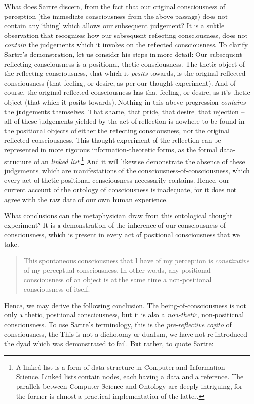 \noindent
What does Sartre discern, from the fact that our original consciousness of perception (the immediate consciousness from the above passage) does not contain any \enquote*{thing} which allows our subsequent judgement? It is a subtle observation that recognises how our subsequent reflecting consciousness, does not \emph{contain} the judgements which it invokes on the reflected consciousness.
To clarify Sartre's demonstration, let us consider his steps in more detail:
Our subsequent reflecting consciousness is a positional, thetic consciousness. The thetic object of the reflecting consciousness, that which it \emph{posits} towards, is the original reflected consciousness (that feeling, or desire, as per our thought experiment). And of course, the original reflected consciousness has that feeling, or desire, as it's thetic object (that which it posits towards). Nothing in this above progression \emph{contains} the judgements themselves. That shame, that pride, that desire, that rejection -- all of these judgements yielded by the act of reflection is nowhere to be found in the positional objects of either the reflecting consciousness, nor the original reflected consciousness. This thought experiment of the reflection can be represented in more rigorous information-theoretic forms, as the formal data-structure of an \emph{linked list}.\footnote{A linked list is a form of data-structure in Computer and Information Science. Linked lists contain nodes, each having a data and a reference. The parallels between Computer Science and Ontology are deeply intriguing, for the former is almost a practical implementation of the latter.} And it will likewise demonstrate the absence of these judgements, which are manifestations of the consciousness-of-consciousness, which every act of thetic positional consciousness necessarily contains. Hence, our current account of the ontology of consciousness is inadequate, for it does not agree with the raw data of our own human experience.

What conclusions can the metaphysician draw from this ontological thought experiment? It is a demonstration of the inherence of our consciousness-of-consciousness, which is present in every act of positional consciousness that we take. 
\blockcquote[11]{Sartre}{This spontaneous consciousness that I have of my perception is \emph{constitutive} of my perceptual consciousness. In other words, any positional consciousness of an object is at the same time a non-positional consciousness of itself.} Hence, we may derive the following conclusion. The being-of-consciousness is not only a thetic, positional consciousness, but it is also a \emph{non-thetic}, non-positional consciousness. To use Sartre's terminology, this is the \emph{pre-reflective cogito} of consciousness, the  This is not a dichotomy or dualism, we have not re-introduced the dyad which was demonstrated to fail. But rather, to quote Sartre:

